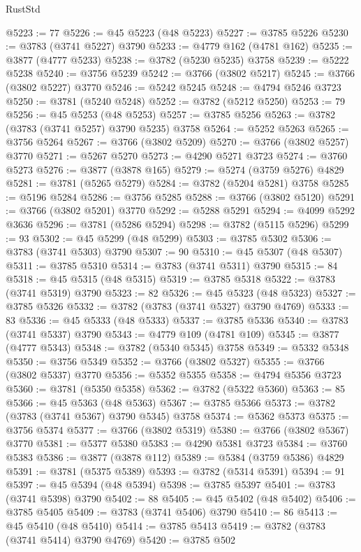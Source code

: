\begin{lexlean}{RustStd}
\begin{coremodule}
@5223 := 77
@5226 := @45 @5223 (@48 @5223)
@5227 := @3785 @5226
@5230 := @3783 (@3741 @5227) @3790
@5233 := @4779 @162 (@4781 @162)
@5235 := @3877 (@4777 @5233)
@5238 := @3782 (@5230 @5235) @3758
@5239 := @5222 @5238
@5240 := @3756 @5239
@5242 := @3766 (@3802 @5217)
@5245 := @3766 (@3802 @5227) @3770
@5246 := @5242 @5245
@5248 := @4794 @5246 @3723
@5250 := @3781 (@5240 @5248)
@5252 := @3782 (@5212 @5250)
@5253 := 79
@5256 := @45 @5253 (@48 @5253)
@5257 := @3785 @5256
@5263 := @3782 (@3783 (@3741 @5257) @3790 @5235) @3758
@5264 := @5252 @5263
@5265 := @3756 @5264
@5267 := @3766 (@3802 @5209)
@5270 := @3766 (@3802 @5257) @3770
@5271 := @5267 @5270
@5273 := @4290 @5271 @3723
@5274 := @3760 @5273
@5276 := @3877 (@3878 @165)
@5279 := @5274 (@3759 @5276) @4829
@5281 := @3781 (@5265 @5279)
@5284 := @3782 (@5204 @5281) @3758
@5285 := @5196 @5284
@5286 := @3756 @5285
@5288 := @3766 (@3802 @5120)
@5291 := @3766 (@3802 @5201) @3770
@5292 := @5288 @5291
@5294 := @4099 @5292 @3636
@5296 := @3781 (@5286 @5294)
@5298 := @3782 (@5115 @5296)
@5299 := 93
@5302 := @45 @5299 (@48 @5299)
@5303 := @3785 @5302
@5306 := @3783 (@3741 @5303) @3790
@5307 := 90
@5310 := @45 @5307 (@48 @5307)
@5311 := @3785 @5310
@5314 := @3783 (@3741 @5311) @3790
@5315 := 84
@5318 := @45 @5315 (@48 @5315)
@5319 := @3785 @5318
@5322 := @3783 (@3741 @5319) @3790
@5323 := 82
@5326 := @45 @5323 (@48 @5323)
@5327 := @3785 @5326
@5332 := @3782 (@3783 (@3741 @5327) @3790 @4769)
@5333 := 83
@5336 := @45 @5333 (@48 @5333)
@5337 := @3785 @5336
@5340 := @3783 (@3741 @5337) @3790
@5343 := @4779 @109 (@4781 @109)
@5345 := @3877 (@4777 @5343)
@5348 := @3782 (@5340 @5345) @3758
@5349 := @5332 @5348
@5350 := @3756 @5349
@5352 := @3766 (@3802 @5327)
@5355 := @3766 (@3802 @5337) @3770
@5356 := @5352 @5355
@5358 := @4794 @5356 @3723
@5360 := @3781 (@5350 @5358)
@5362 := @3782 (@5322 @5360)
@5363 := 85
@5366 := @45 @5363 (@48 @5363)
@5367 := @3785 @5366
@5373 := @3782 (@3783 (@3741 @5367) @3790 @5345) @3758
@5374 := @5362 @5373
@5375 := @3756 @5374
@5377 := @3766 (@3802 @5319)
@5380 := @3766 (@3802 @5367) @3770
@5381 := @5377 @5380
@5383 := @4290 @5381 @3723
@5384 := @3760 @5383
@5386 := @3877 (@3878 @112)
@5389 := @5384 (@3759 @5386) @4829
@5391 := @3781 (@5375 @5389)
@5393 := @3782 (@5314 @5391)
@5394 := 91
@5397 := @45 @5394 (@48 @5394)
@5398 := @3785 @5397
@5401 := @3783 (@3741 @5398) @3790
@5402 := 88
@5405 := @45 @5402 (@48 @5402)
@5406 := @3785 @5405
@5409 := @3783 (@3741 @5406) @3790
@5410 := 86
@5413 := @45 @5410 (@48 @5410)
@5414 := @3785 @5413
@5419 := @3782 (@3783 (@3741 @5414) @3790 @4769)
@5420 := @3785 @502

\end{coremodule}
\end{lexlean}
